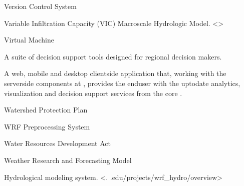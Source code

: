 \documentclass[letterpaper,12pt,english,openany,oneside]{sphinxmanual}
\begin{document}
\begin{description}
\sphinxAtStartPar
Version Control System

\sphinxAtStartPar
Variable Infiltration Capacity (VIC) Macroscale Hydrologic Model.  \textless{}\textgreater{}

\sphinxAtStartPar
Virtual Machine

\sphinxAtStartPar
A suite of decision support tools designed for regional decision makers.

\sphinxAtStartPar
A web, mobile and desktop client\sphinxhyphen{}side application that, working with the server\sphinxhyphen{}side components at {\hyperref[\detokenize{_static/glossary:term-RGVFlood.com}]{}}, provides the end\sphinxhyphen{}user with the up\sphinxhyphen{}to\sphinxhyphen{}date analytics, visualization and decision support services from the core {\hyperref[\detokenize{_static/glossary:term-REON.cc}]{}} {\hyperref[\detokenize{_static/glossary:term-CI}]{}}.

\sphinxAtStartPar
Watershed Protection Plan

\sphinxAtStartPar
WRF Preprocessing System

\sphinxAtStartPar
Water Resources Development Act

\sphinxAtStartPar
Weather Research and Forecasting Model

\sphinxAtStartPar
{\hyperref[\detokenize{_static/glossary:term-WRF}]{}} Hydrological modeling system.   \textless{}.
.edu/projects/wrf\_hydro/overview\textgreater{}

\end{description}
\end{document}

